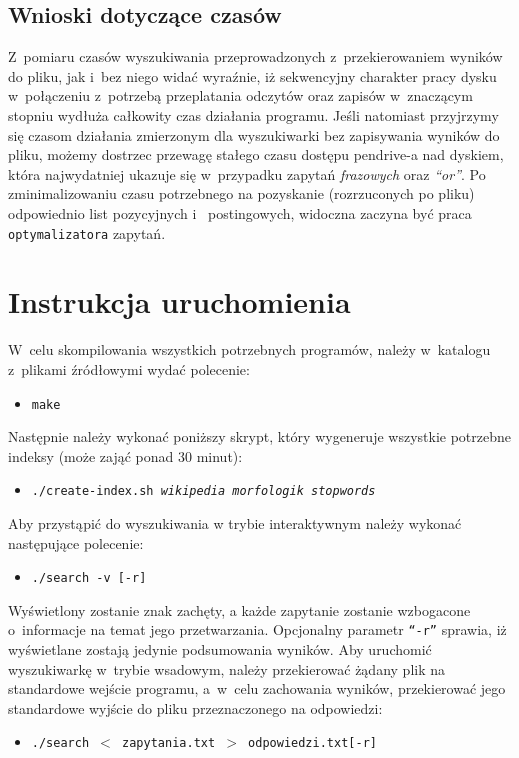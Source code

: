 \documentclass[a4paper,12pt]{article}
\begin{document}
\subsection{Wnioski dotyczące czasów}
Z~pomiaru czasów wyszukiwania przeprowadzonych z~przekierowaniem wyników do
pliku, jak i~bez niego widać wyraźnie, iż sekwencyjny charakter pracy dysku
w~połączeniu z~potrzebą przeplatania odczytów oraz zapisów w~znaczącym stopniu
wydłuża całkowity czas działania programu. Jeśli natomiast przyjrzymy się
czasom działania zmierzonym dla wyszukiwarki bez zapisywania wyników do pliku,
możemy dostrzec przewagę stałego czasu dostępu pendrive-a nad dyskiem, która najwydatniej ukazuje
się w~przypadku zapytań \textit{frazowych} oraz \textit{``or''}. Po
zminimalizowaniu czasu potrzebnego na pozyskanie (rozrzuconych po pliku) odpowiednio list pozycyjnych
i~ postingowych, widoczna zaczyna być praca \texttt{optymalizatora} zapytań.

\newpage

\section{Instrukcja uruchomienia}

W~celu skompilowania wszystkich potrzebnych programów, należy w~katalogu
z~plikami źródłowymi wydać polecenie:
\begin{itemize}
	\item \texttt{make}
\end{itemize}

Następnie należy wykonać poniższy skrypt, który wygeneruje wszystkie potrzebne
indeksy (może zająć ponad 30 minut):
\begin{itemize}
	\item \texttt{./create-index.sh \textit{wikipedia morfologik stopwords}}
\end{itemize}

Aby przystąpić do wyszukiwania w trybie interaktywnym należy wykonać następujące
polecenie:
\begin{itemize}
	\item \texttt{./search -v [-r]}
\end{itemize}
Wyświetlony zostanie znak zachęty, a każde zapytanie zostanie wzbogacone
o~informacje na temat jego przetwarzania. Opcjonalny parametr \texttt{``-r''}
sprawia, iż wyświetlane zostają jedynie podsumowania wyników.
\linebreak
\linebreak
Aby uruchomić wyszukiwarkę w~trybie wsadowym, należy przekierować żądany plik
na standardowe wejście programu, a~w~celu zachowania wyników, przekierować jego
standardowe wyjście do pliku przeznaczonego na odpowiedzi:
\begin{itemize}
	\item \texttt{./search $<$ zapytania.txt $>$ odpowiedzi.txt[-r]}
\end{itemize}
\end{document}
